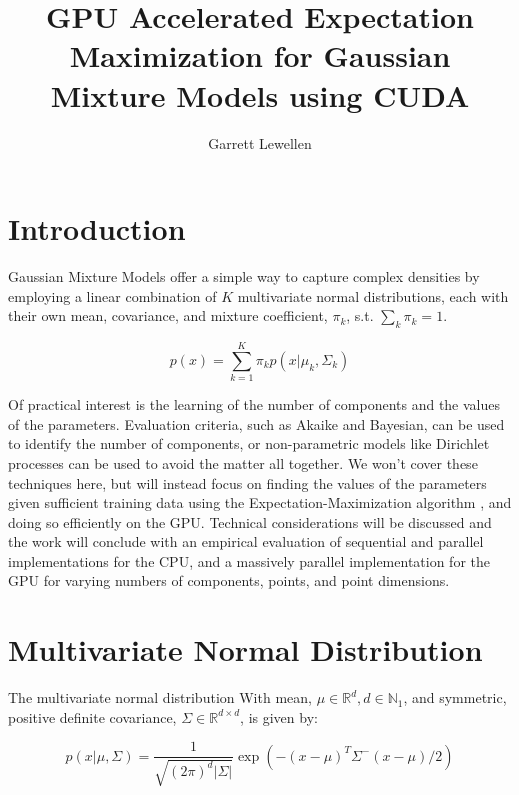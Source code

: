 \documentclass{article}
\begin{document}
\author{Garrett Lewellen}
\title{GPU Accelerated Expectation Maximization for Gaussian Mixture Models using CUDA}

\maketitle

\section{Introduction}

Gaussian Mixture Models \cite[435-439]{bishop2006} offer a simple way to capture complex densities by employing a linear combination of $K$ multivariate normal distributions, each with their own mean, covariance, and mixture coefficient, $\pi_{k}$, s.t. $\sum_{k} \pi_{k} = 1$.

\begin{equation}
	p( x ) = \sum_{k = 1}^{K} \pi_{k} p(x \lvert \mu_k, \Sigma_k)
\end{equation}

Of practical interest is the learning of the number of components and the values of the parameters. Evaluation criteria, such as Akaike and Bayesian, can be used to identify the number of components, or non-parametric models like Dirichlet processes can be used to avoid the matter all together. We won't cover these techniques here, but will instead focus on finding the values of the parameters given sufficient training data using the Expectation-Maximization algorithm \cite{dempster1977maximum}, and doing so efficiently on the GPU. Technical considerations will be discussed and the work will conclude with an empirical evaluation of sequential and parallel implementations for the CPU, and a massively parallel implementation for the GPU for varying numbers of components, points, and point dimensions.

\section{Multivariate Normal Distribution}

The multivariate normal distribution With mean, $\mu \in \mathbb{R}^d, d \in \mathbb{N}_1$, and symmetric, positive definite covariance, $\Sigma \in \mathbb{R}^{d \times d}$, is given by:

\begin{equation}
	p( x \lvert \mu, \Sigma ) = \frac{1}{\sqrt{(2\pi)^d \lvert \Sigma \rvert }} \exp{\left( - (x - \mu)^{T} \Sigma^{-} (x - \mu) / 2 \right)}
	\label{eqn:mvn}
\end{equation}
\end{document}
